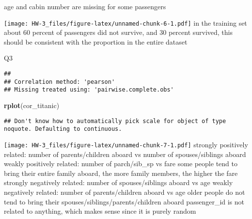 \documentclass[]{article}
\newenvironment{Shaded}{\begin{snugshade}}{\end{snugshade}}
\newcommand{\DataTypeTok}[1]{\textcolor[rgb]{0.13,0.29,0.53}{#1}}
\newcommand{\KeywordTok}[1]{\textcolor[rgb]{0.13,0.29,0.53}{\textbf{#1}}}
\newcommand{\NormalTok}[1]{#1}
\newcommand{\OperatorTok}[1]{\textcolor[rgb]{0.81,0.36,0.00}{\textbf{#1}}}
\newcommand{\StringTok}[1]{\textcolor[rgb]{0.31,0.60,0.02}{#1}}
\begin{document}
age and cabin number are missing for some passengers

\begin{Shaded}
\end{Shaded}

\texttt{[image: HW-3\_files/figure-latex/unnamed-chunk-6-1.pdf]} in the
training set about 60 percent of passengers did not survive, and 30
percent survived, this should be consistent with the proportion in the
entire dataset

Q3

\begin{Shaded}
\end{Shaded}

\begin{verbatim}
## 
## Correlation method: 'pearson'
## Missing treated using: 'pairwise.complete.obs'
\end{verbatim}

\begin{Shaded}
\begin{Highlighting}[]
\KeywordTok{rplot}\NormalTok{(cor_titanic)}
\end{Highlighting}
\end{Shaded}

\begin{verbatim}
## Don't know how to automatically pick scale for object of type noquote. Defaulting to continuous.
\end{verbatim}

\texttt{[image: HW-3\_files/figure-latex/unnamed-chunk-7-1.pdf]} strongly
positively related: number of parents/children aboard vs number of
spouses/siblings aboard weakly positively related: number of
parch/sib\_sp vs fare some people tend to bring their entire family
aboard, the more family members, the higher the fare strongly negatively
related: number of spouses/siblings aboard vs age weakly negatively
related: number of parents/children aboard vs age older people do not
tend to bring their spouses/siblings/parents/children aboard
passenger\_id is not related to anything, which makes sense since it is
purely random
\end{document}
